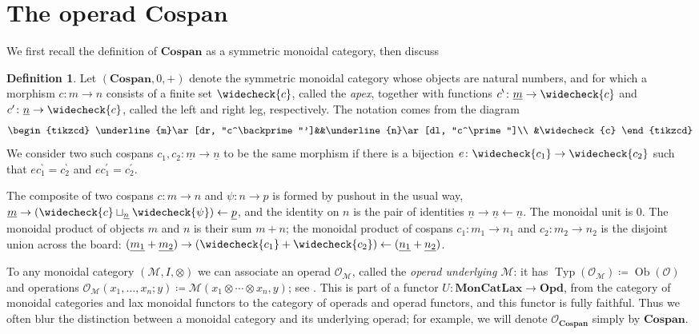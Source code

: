 \documentclass[11pt, article, oneside]{memoir}
\theoremstyle{plain}
\theoremstyle{definition}
\newtheorem{definition}[theorem]{Definition}
\theoremstyle{remark}
\newcommand{\cat}[1]{\mathcal{#1}}
\newcommand{\Cat}[1]{\mathbf{#1}}
\DeclareMathOperator{\Ob}{Ob}
\DeclareMathOperator{\Typ}{Typ}
\newcommand{\from}{\leftarrow}
\newcommand{\ul}[1]{\underline{#1}}
\newcommand{\Cospan}{\Cat{Cospan}}
\newcommand{\OO}{\cat{O}}
\newcommand{\lleg}[1]{#1^\backprime}
\newcommand{\rleg}[1]{#1^\prime}
\newcommand{\apex}[1]{\widecheck{#1}}
\newcommand{\cmap}{c}
\begin{document}
\section{The operad $\Cospan$}

We first recall the definition of $\Cospan$ as a symmetric monoidal category, then discuss

\begin{definition}
Let $(\Cospan,0,+)$ denote the symmetric monoidal category whose objects are natural numbers, and for which a morphism $\cmap\colon m\to n$ consists of a finite set $\apex{\cmap}$, called the \emph{apex}, together with functions $\lleg\cmap\colon\ul{m}\to\apex{\cmap}$ and $\rleg\cmap\colon\ul{n}\to\apex{\cmap}$, called the left and right leg, respectively. The notation comes from the diagram
\[
\begin{tikzcd}
	\ul{m}\ar[dr, "\lleg\cmap"']&&\ul{n}\ar[dl, "\rleg\cmap"]\\
	&\apex{\cmap}
\end{tikzcd}
\]
We consider two such cospans $\cmap_1,\cmap_2\colon \ul{m}\to \ul{n}$ to be the same morphism if there is a bijection $e\colon\apex{\cmap_1}\to\apex{\cmap_2}$ such that $e\lleg\cmap_1=\lleg\cmap_2$ and $e\rleg\cmap_1=\rleg\cmap_2$.

The composite of two cospans $\cmap\colon m\to n$ and $\psi\colon n\to p$ is formed by pushout in the usual way, $\ul{m}\to(\apex{\cmap}\sqcup_{\ul{n}}\apex{\psi})\from\ul{p}$, and the identity on $n$ is the pair of identities $\ul{n}\to \ul{n}\from \ul{n}$. The monoidal unit is $0$. The monoidal product of objects $m$ and $n$ is their sum $m+n$; the monoidal product of cospans $\cmap_1\colon m_1\to n_1$ and $\cmap_2\colon m_2\to n_2$ is the disjoint union across the board: $(\ul{m_1}+\ul{m_2})\to(\apex{\cmap_1}+\apex{\cmap_2})\from (\ul{n_1}+\ul{n_2})$.
\end{definition}

To any monoidal category $(\cat{M},I,\otimes)$ we can associate an operad $\OO_\cat{M}$, called the \emph{operad underlying $\cat{M}$}: it has $\Typ(\OO_\cat{M})\coloneqq\Ob(\cat{O})$ and operations $\OO_{\cat{M}}(x_1,\ldots,x_n;y)\coloneqq\cat{M}(x_1\otimes\cdots\otimes x_n,y)$; see \cite{Leinster:2004a}. This is part of a functor $U\colon\Cat{MonCatLax}\to\Cat{Opd}$, from the category of monoidal categories and lax monoidal functors to the category of operads and operad functors, and this functor is fully faithful. Thus we often blur the distinction between a monoidal category and its underlying operad; for example, we will denote $\OO_{\Cospan}$ simply by $\Cospan$.
\end{document}
